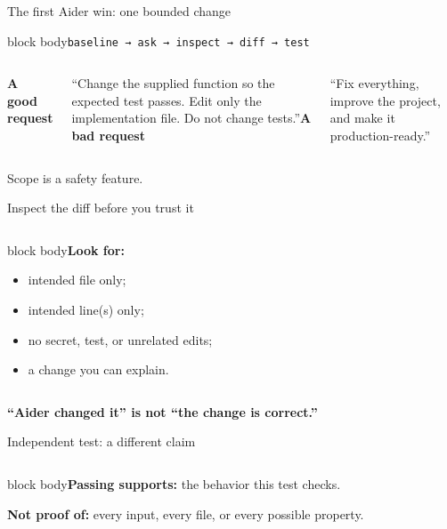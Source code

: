 \documentclass[aspectratio=169,11pt]{beamer}
\begin{document}
\begin{frame}{The first Aider win: one bounded change}\vspace{.5cm}\begin{beamercolorbox}[sep=.8em,wd=\linewidth]{block body}\centering\Large\texttt{baseline → ask → inspect → diff → test}\end{beamercolorbox}\vspace{.55cm}\begin{columns}[T]\textbf{A good request}\par\small “Change the supplied function so the expected test passes. Edit only the implementation file. Do not change tests.”\textbf{A bad request}\par\small “Fix everything, improve the project, and make it production-ready.”\end{columns}\vfill\textcolor{gold!80!black}{Scope is a safety feature.}\end{frame}
\begin{frame}{Inspect the diff before you trust it}\begin{columns}[T]\begin{beamercolorbox}[sep=.7em,wd=\linewidth]{block body}\textbf{Look for:}\begin{itemize}\item intended file only;\item intended line(s) only;\item no secret, test, or unrelated edits;\item a change you can explain.\end{itemize}\end{beamercolorbox}\end{columns}\vfill\begin{center}\textcolor{gold!80!black}{\Large\textbf{“Aider changed it” is not “the change is correct.”}}\end{center}\end{frame}
\begin{frame}{Independent test: a different claim}\begin{columns}[T]\begin{beamercolorbox}[sep=.6em,wd=\linewidth]{block body}\textbf{Passing supports:} the behavior this test checks.\par\vspace{.2cm}\textbf{Not proof of:} every input, every file, or every possible property.\end{beamercolorbox}\end{columns}\vfill{}\end{frame}
\end{document}
